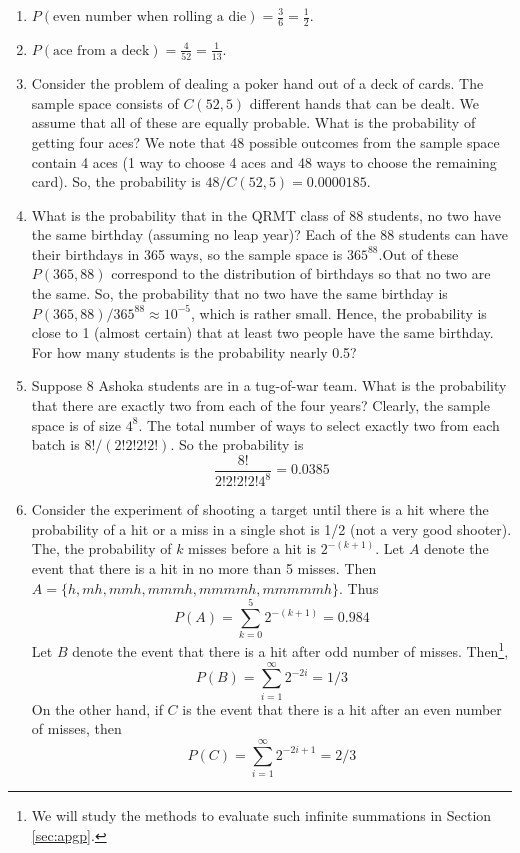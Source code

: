 \begin{example}
\begin{enumerate}
  \item $P(\text{even number when rolling a die}) = \frac{3}{6} = \frac{1}{2}$.
  \item $P(\text{ace from a deck}) = \frac{4}{52} = \frac{1}{13}$.
  \item Consider the problem of dealing a poker hand out of a deck of cards. The sample space consists of $C(52,5)$ different hands that can be dealt. We assume that all of these are equally probable. What is the
          probability of getting four aces? We note that 48 possible outcomes from the sample space contain 4 aces (1 way to choose 4 aces and 48 ways to choose the remaining card). So, the probability is
          $48/C(52,5) = 0.0000185$.
  \item What is the probability that in the QRMT class of 88 students, no two have the same birthday (assuming no leap year)? Each of the 88 students can have their birthdays in 365 ways, so the sample space is $365^{88}$.Out of
           these $P(365,88)$ correspond to the distribution of birthdays so that no two are the same. So, the probability that no two have the same birthday is $P(365,88)/365^{88} \approx 10^{-5}$, which is rather small. Hence, the probability is close to 1 (almost certain) that at least two people have the same birthday. For how many students is the probability nearly 0.5?
  \item Suppose 8 Ashoka students are in a tug-of-war team. What is the probability that there are exactly two from each of the four years? Clearly, the sample space is of size $4^8$. The total number of ways to select exactly two from each batch is $8!/(2!2!2!2!)$. So the probability is
  \[
    \frac{8!}{2!2!2!2!4^8} = 0.0385
  \]
\item Consider the experiment of shooting a target until there is a hit where the probability of a hit or a miss in a single shot is 1/2 (not a very good shooter). The, the probability of $k$ misses before a hit is $2^{-(k+1)}$. Let
$A$ denote the event that there is a hit in no more than 5 misses. Then $A = \{h,mh,mmh,mmmh,mmmmh,mmmmmh\}$. Thus
\[
P(A) = \sum_{k=0}^5 2^{-(k+1)} = 0.984
\]
Let $B$ denote the event that there is a hit after odd number of misses. Then\footnote{We will study the methods to evaluate such infinite summations in Section \ref{sec:apgp}.},
\[
P(B) = \sum_{i=1}^\infty 2^{-2i} = 1/3
\]
On the other  hand, if $C$ is the event that there is a hit after an even number of misses, then
\[
P(C) = \sum_{i=1}^\infty 2^{-2i+1} = 2/3
\]
\end{enumerate}
\end{example}

